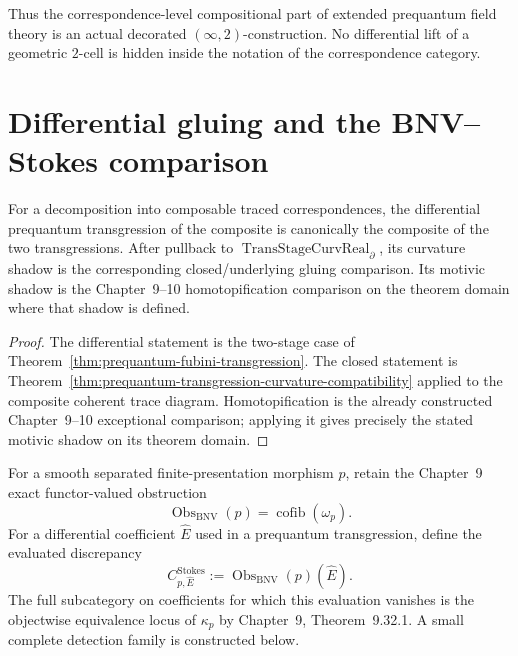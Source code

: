 Thus the correspondence-level compositional part of extended prequantum field
theory is an actual decorated $(\infty,2)$-construction.  No differential lift of
a geometric $2$-cell is hidden inside the notation of the correspondence
category.

\section{Differential gluing and the BNV--Stokes comparison}
\label{sec:prequantum-gluing-stokes}

\begin{theorem}
\label{thm:prequantum-primary-differential-gluing}
For a decomposition into composable traced correspondences, the differential
prequantum transgression of the composite is canonically the composite of the two
transgressions.  After pullback to
$\operatorname{TransStageCurvReal}_{\partial}$, its curvature shadow is
the corresponding closed/underlying gluing comparison.  Its motivic shadow is the
Chapter~9--10 homotopification comparison on the theorem domain where that shadow
is defined.
\end{theorem}

\begin{proof}
The differential statement is the two-stage case of
Theorem~\ref{thm:prequantum-fubini-transgression}.  The closed statement is
Theorem~\ref{thm:prequantum-transgression-curvature-compatibility} applied to the
composite coherent trace diagram.  Homotopification is the already constructed
Chapter~9--10 exceptional comparison; applying it gives precisely the stated
motivic shadow on its theorem domain.
\end{proof}

\begin{construction}
\label{constr:prequantum-bnv-stokes-discrepancy}
For a smooth separated finite-presentation morphism $p$, retain the Chapter~9
exact functor-valued obstruction
\[
\operatorname{Obs}_{\mathrm{BNV}}(p)
=
\operatorname{cofib}(\omega_p).
\]
For a differential coefficient $\widehat E$ used in a prequantum transgression,
define the evaluated discrepancy
\[
\boxed{
C^{\mathrm{Stokes}}_{p,\widehat E}
:=
\operatorname{Obs}_{\mathrm{BNV}}(p)(\widehat E).
}
\]
The full subcategory on coefficients for which this evaluation vanishes is the
objectwise equivalence locus of $\kappa_p$ by Chapter~9,
Theorem~9.32.1.  A small complete detection family is constructed below.
\end{construction}

